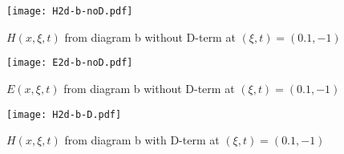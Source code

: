 \documentclass[preprintnumbers,prd,superscriptaddress,preprint]{revtex4-1}
\begin{document}
	\begin{figure}[htbp]
		\begin{center}
			\texttt{[image: H2d-b-noD.pdf]}
			\caption{$H(x,\xi,t)$ from diagram b without D-term at $(\xi,t)=(0.1,-1)$} 
			\label{H-b-nD}
		\end{center}
	\end{figure}
	
	\begin{figure}[h]
		\begin{center}
			\texttt{[image: E2d-b-noD.pdf]}
			\caption{$E(x,\xi,t)$ from diagram b without D-term at $(\xi,t)=(0.1,-1)$} 
			\label{E-b-nD}
		\end{center}
	\end{figure}
	
	\begin{figure}[h]
		\begin{center}
			\texttt{[image: H2d-b-D.pdf]}
			\caption{$H(x,\xi,t)$ from diagram b with D-term at $(\xi,t)=(0.1,-1)$} 
			\label{H-b-D}
		\end{center}
	\end{figure}
	
\end{document}
